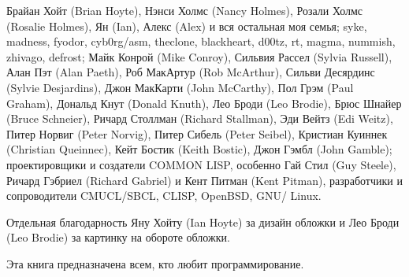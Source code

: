 Брайан Хойт (Brian Hoyte), Нэнси Холмс (Nancy Holmes), Розали Холмс (Rosalie Holmes), Ян (Ian), Алекс (Alex) и вся остальная моя семья; syke, madness, fyodor, cyb0rg/asm, theclone, blackheart, d00tz, rt, magma, nummish, zhivago, defrost; Майк Конрой (Mike Conroy), Сильвия Рассел (Sylvia Russell), Алан Пэт (Alan Paeth), Роб МакАртур (Rob McArthur), Сильви Десярдинс (Sylvie Desjardins), Джон МакКарти (John McCarthy), Пол Грэм (Paul Graham), Дональд Кнут (Donald Knuth), Лео Броди (Leo Brodie), Брюс Шнайер (Bruce Schneier), Ричард Столлман (Richard Stallman), Эди Вейтз (Edi Weitz), Питер Норвиг (Peter Norvig), Питер Сибель (Peter Seibel), Кристиан Куиннек (Christian Queinnec), Кейт Бостик (Keith Bostic), Джон Гэмбл (John Gamble); проектировщики и создатели COMMON LISP, особенно Гай Стил (Guy Steele), Ричард Гэбриел (Richard Gabriel) и Кент Питман (Kent Pitman), разработчики и сопроводители CMUCL/SBCL, CLISP, OpenBSD, GNU/ Linux.

Отдельная благодарность Яну Хойту (Ian Hoyte) за дизайн обложки и Лео Броди (Leo Brodie) за картинку на обороте обложки.

Эта книга предназначена всем, кто любит программирование.
